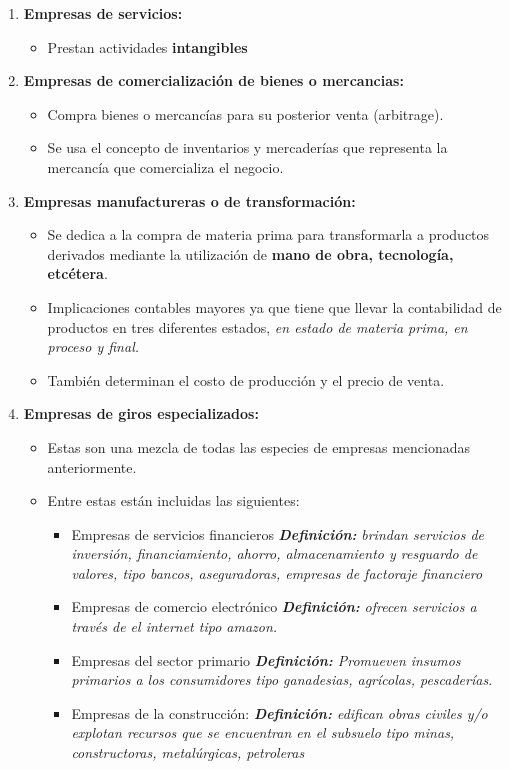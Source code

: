 \documentclass{article}
\begin{document}
\begin{enumerate}
    \item \textbf{Empresas de servicios:}
    \begin{itemize}
        \item Prestan actividades \textbf{intangibles}
    \end{itemize}

    
    \item \textbf{Empresas de comercialización de bienes o mercancias:}
    \begin{itemize}
        \item Compra bienes o mercancías para su posterior venta (arbitrage).
        \item Se usa el concepto de inventarios y mercaderías que representa la mercancía que comercializa el negocio.
    \end{itemize}

    
    \item \textbf{Empresas manufactureras o de transformación:}
    \begin{itemize}
        \item Se dedica a la compra de materia prima para transformarla a productos derivados mediante la utilización de \textbf{mano de obra, tecnología, etcétera}.
        \item Implicaciones contables mayores  ya que tiene que llevar la contabilidad de productos en tres diferentes estados, \emph{en estado de materia prima, en proceso y final.}
        \item También determinan el costo de producción y el precio de venta.
    \end{itemize}

    
    \item \textbf{Empresas de giros especializados:}
    \begin{itemize}
        \item Estas son una mezcla de todas las especies de empresas mencionadas anteriormente.
        \item Entre estas están incluidas las siguientes:
        \begin{itemize}
            \item Empresas de servicios financieros \textbf{\emph{Definición:}} \emph{brindan servicios de inversión, financiamiento, ahorro, almacenamiento y resguardo de valores, tipo bancos, aseguradoras, empresas de factoraje financiero}
            \item Empresas de comercio electrónico \textbf{\emph{Definición:}} \emph{ ofrecen servicios a través de el internet tipo amazon.}
            \item Empresas del sector primario \emph{\textbf{Definición:} Promueven insumos primarios a los consumidores tipo ganadesias, agrícolas, pescaderías.}
            \item Empresas de la construcción: \emph{\textbf{Definición:} edifican obras civiles y/o explotan recursos que se encuentran en el subsuelo tipo minas, constructoras, metalúrgicas, petroleras}
        \end{itemize}
    \end{itemize}
\end{enumerate}
\end{document}
